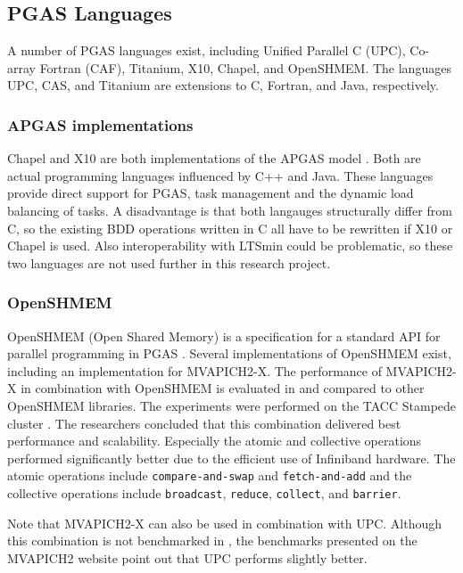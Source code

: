 \subsection{PGAS Languages}
A number of PGAS languages exist, including Unified Parallel C (UPC), Co-array Fortran (CAF), Titanium, X10, Chapel, and OpenSHMEM. The languages UPC, CAS, and Titanium are extensions to C, Fortran, and Java, respectively. 

\subsubsection{APGAS implementations}
Chapel and X10 are both implementations of the APGAS model \cite{Chamberlain:2007:PPC:1286120.1286123, Charles:2005:XOA:1103845.1094852}. Both are actual programming languages influenced by C++ and Java. These languages provide direct support for PGAS, task management and the dynamic load balancing of tasks. A disadvantage is that both langauges structurally differ from C, so the existing BDD operations written in C all have to be rewritten if X10 or Chapel is used. Also interoperability with LTSmin could be problematic, so these two languages are not used further in this research project.

\subsubsection{OpenSHMEM}
OpenSHMEM (Open Shared Memory) is a specification for a standard API for parallel programming in PGAS \cite{openshmem}. Several implementations of OpenSHMEM exist, including an implementation for MVAPICH2-X. The performance of MVAPICH2-X in combination with OpenSHMEM is evaluated in \cite{openshmem_perf_evaluation} and compared to other OpenSHMEM libraries. The experiments were performed on the TACC Stampede cluster \cite{stampede_cluster}. The researchers concluded that this combination delivered best performance and scalability. Especially the atomic and collective operations performed significantly better due to the efficient use of Infiniband hardware. The atomic operations include \texttt{compare-and-swap} and \texttt{fetch-and-add} and the collective operations include \texttt{broadcast}, \texttt{reduce}, \texttt{collect}, and \texttt{barrier}. 

Note that MVAPICH2-X can also be used in combination with UPC. Although this combination is not benchmarked in \cite{openshmem_perf_evaluation}, the benchmarks presented on the MVAPICH2 website point out that UPC performs slightly better.